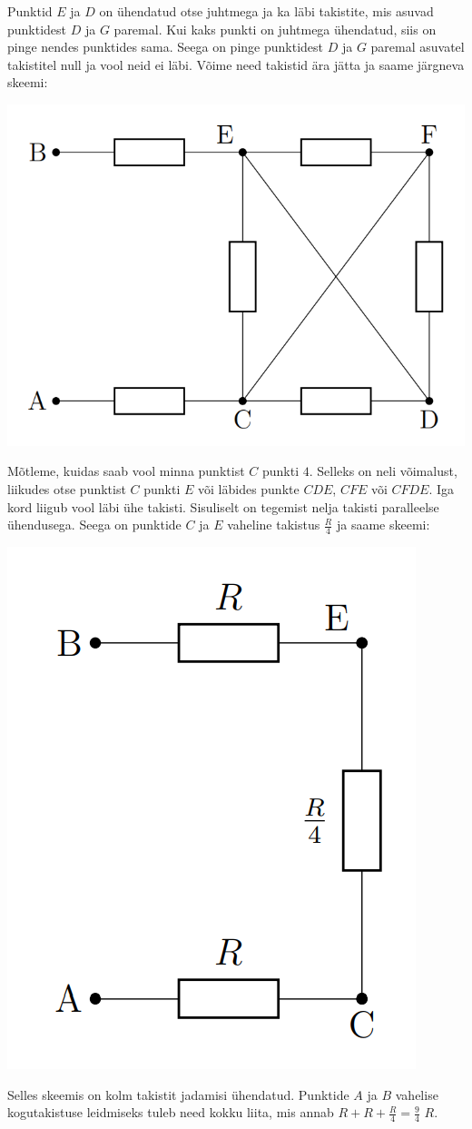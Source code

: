 {Punktid $E$ ja $D$ on ühendatud otse juhtmega ja ka läbi takistite, mis asuvad punktidest $D$ ja $G$ paremal. Kui kaks punkti on juhtmega ühendatud, siis on pinge nendes punktides sama. Seega on pinge punktidest $D$ ja $G$ paremal asuvatel takistitel null ja vool neid ei läbi. Võime need takistid ära jätta ja saame järgneva skeemi:
\begin{center}
	\includegraphics[width=0.5\linewidth]{2017-v3p-08-lah2.png}
\end{center}
Mõtleme, kuidas saab vool minna punktist $C$ punkti $4$. Selleks on neli võimalust, liikudes otse punktist $C$ punkti $E$ või läbides punkte $CDE$, $CFE$ või $CFDE$. Iga kord liigub vool läbi ühe takisti. Sisuliselt on tegemist nelja takisti paralleelse ühendusega. Seega on punktide $C$ ja $E$ vaheline takistus $\frac{R}{4}$ ja saame skeemi:
\begin{center}
	\includegraphics[width=0.5\linewidth]{2017-v3p-08-lah3.png}
\end{center}

Selles skeemis on kolm takistit jadamisi ühendatud. Punktide $A$ ja $B$ vahelise kogutakistuse leidmiseks tuleb need kokku liita, mis annab $R + R + \frac{R}{4}= \frac{9}{4}$  $R$.
\fi
}